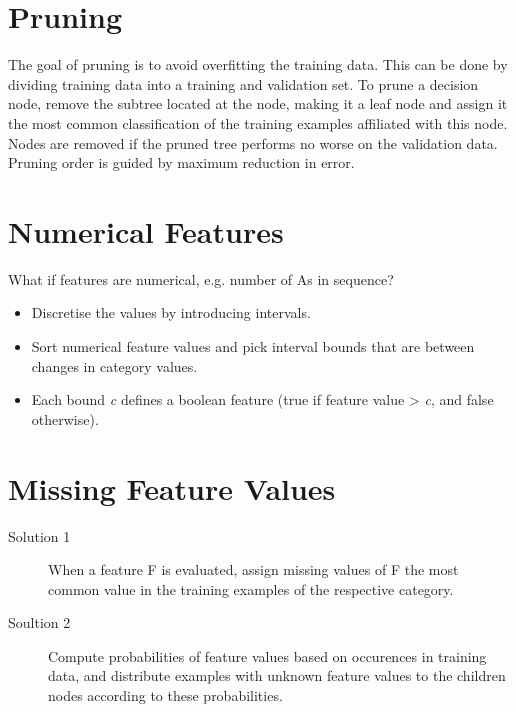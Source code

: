 \documentclass[11pt]{article}
\begin{document}
\section{Pruning}
\label{sec:org534b628}
The goal of pruning is to avoid overfitting the training data.
This can be done by dividing training data into a training and validation set.
To prune a decision node, remove the subtree located at the node, making it a leaf node and assign it the most common classification of the training examples affiliated with this node.
Nodes are removed if the pruned tree performs no worse on the validation data.
Pruning order is guided by maximum reduction in error.

\section{Numerical Features}
\label{sec:orgce5ed66}
What if features are numerical, e.g. number of As in sequence?
\begin{itemize}
\item Discretise the values by introducing intervals.
\item Sort numerical feature values and pick interval bounds that are between changes in category values.
\item Each bound \emph{c} defines a boolean feature (true if feature value > \emph{c}, and false otherwise).
\end{itemize}

\section{Missing Feature Values}
\label{sec:org59ed75b}
\begin{description}
\item[{Solution 1}] When a feature F is evaluated, assign missing values of F the most common value in the training examples of the respective category.
\item[{Soultion 2}] Compute probabilities of feature values based on occurences in training data, and distribute examples with unknown feature values to the children nodes according to these probabilities.
\end{description}
\end{document}

